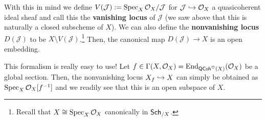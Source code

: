 \documentclass[11pt]{article}
\newcommand{\J}{\mathcal{J}}
\begin{document}
With this in mind we define $V(\J):=\Spec_X\O_X/\J$ for $\J\inj\O_X$ a quasicoherent ideal sheaf and call this the \textbf{vanishing locus} of $\J$ (we saw above that this is naturally a closed subscheme of $X$). We can also define the \textbf{nonvanishing locus} $D(\J)$ to be $X\setminus V(\J)$.\footnote{Recall that $X\cong\operatorname{Spec}_X\mathcal{O}_X$ canonically in $\operatorname{\mathsf{Sch}}_{/X}$.} Then, the canonical map $D(\J)\to X$ is an open embedding.

\begin{remark}
This formalism is really easy to use! Let $f\in\Gamma(X,\mathcal{O}_X)=\operatorname{End}_{\operatorname{\mathsf{QCoh}}^{\heartsuit}(X)}(\mathcal{O}_X)$ be a global section. Then, the nonvanishing locus $X_f\hookrightarrow X$ can simply be obtained as $\operatorname{Spec}_X\mathcal{O}_X[f^{-1}]$ and we readily see that this is an open subspace of $X$.
\end{remark}
\end{document}
